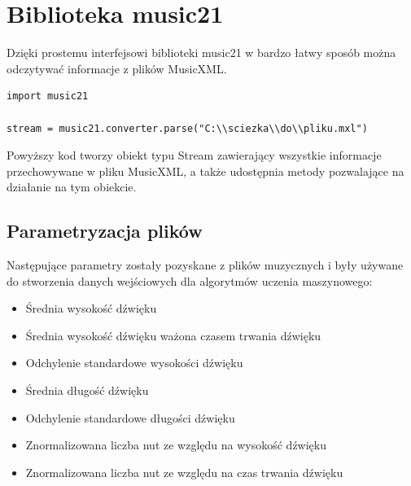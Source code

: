 \documentclass[printmode, eng, openany]{mgr}
\newcommand\tab[1][1cm]{\hspace*{#1}}
\begin{document}
\section{Biblioteka music21}
\tab Dzięki prostemu interfejsowi biblioteki music21 w bardzo łatwy sposób można odczytywać informacje z plików MusicXML.
\begin{lstlisting}
import music21

stream = music21.converter.parse("C:\\sciezka\\do\\pliku.mxl")
\end{lstlisting}
\tab Powyższy kod tworzy obiekt typu Stream zawierający wszystkie informacje przechowywane w pliku MusicXML, a także udostępnia metody pozwalające na działanie na tym obiekcie. 
\subsection{Parametryzacja plików}
\tab Następujące parametry zostały pozyskane z plików muzycznych i były używane do stworzenia danych wejściowych dla algorytmów uczenia maszynowego:
\begin{itemize}
\item Średnia wysokość dźwięku
\item Średnia wysokość dźwięku ważona czasem trwania dźwięku
\item Odchylenie standardowe wysokości dźwięku
\item Średnia długość dźwięku
\item Odchylenie standardowe długości dźwięku
\item Znormalizowana liczba nut ze względu na wysokość dźwięku
\item Znormalizowana liczba nut ze względu na czas trwania dźwięku
\end{itemize}
\end{document}
